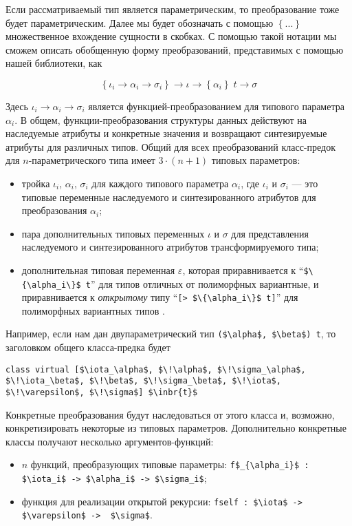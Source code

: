 Если рассматриваемый тип является параметрическим, то преобразование тоже будет параметрическим. Далее мы будет обозначать с помощью
$\left\{...\right\}$ множественное вхождение сущности в скобках. С помощью такой нотации мы сможем описать обобщенную форму преобразований, представимых с помощью нашей библиотеки, как

\[
  \left\{\iota_i \to \alpha_i \to \sigma_i\right\}\to\iota \to\left\{\alpha_i\right\}\;t \to \sigma
\]

Здесь $\iota_i\to\alpha_i\to\sigma_i$ является функцией-пре\-образованием для типового параметра $\alpha_i$. В общем, функции-преобразования структуры данных действуют на наследуемые атрибуты и конкретные значения и возвращают синтезируемые атрибуты для различных типов. Общий для всех преобразований класс-предок для $n$-параметрического типа имеет $3\cdot(n+1)$ типовых параметров:

\begin{itemize}
\item тройка $\iota_i$, $\alpha_i$, $\sigma_i$ для каждого типового параметра $\alpha_i$, где $\iota_i$ и $\sigma_i$ --- это типовые переменные наследуемого и синтезированного атрибутов для преобразования  $\alpha_i$;
\item пара дополнительных типовых переменных $\iota$ и $\sigma$ для представления наследуемого и синтезированного атрибутов трансформируемого типа;
\item дополнительная типовая переменная $\varepsilon$, которая приравнивается к ``\lstinline|$\{\alpha_i\}$ t|'' для типов отличных от полиморфных вариантные, и приравнивается к \emph{открытому} типу ``\lstinline|[> $\{\alpha_i\}$ t]|'' для полиморфных вариантных типов %
.
\end{itemize}

Например, если нам дан двупараметрический тип \lstinline{($\alpha$, $\beta$) t}, то заголовком общего класса-предка будет 

\begin{lstlisting}
class virtual [$\iota_\alpha$, $\!\alpha$, $\!\sigma_\alpha$, $\!\iota_\beta$, $\!\beta$, $\!\sigma_\beta$, $\!\iota$, $\!\varepsilon$, $\!\sigma$] $\inbr{t}$
\end{lstlisting}

Конкретные преобразования будут наследоваться от этого класса и, возможно, конкретизировать некоторые из типовых параметров.
Дополнительно конкретные классы получают несколько аргументов-функций:

\begin{itemize}
\item $n$ функций, преобразующих типовые параметры: \lstinline|f$_{\alpha_i}$ : $\iota_i$ -> $\alpha_i$ -> $\sigma_i$|;
\item функция для реализации открытой рекурсии: \lstinline|fself : $\iota$ -> $\varepsilon$ ->  $\sigma$|.
\end{itemize}

